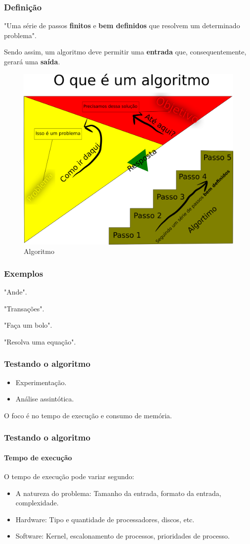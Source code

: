 \begin{frame}
	\frametitle{Definição}
	\par "Uma série de passos \textbf{finitos} e \textbf{bem definidos} que resolvem um determinado problema".
	\par Sendo assim, um algoritmo deve permitir uma \textbf{entrada} que, consequentemente, gerará uma \textbf{saída}.
	\begin{figure}
		\centering
		\includegraphics[width=0.3\linewidth]{images/oQueSaoAlgoritmos}
		\caption{Algoritmo}
		\label{fig:oquesaoalgoritmos}
	\end{figure}
	
\end{frame}

\begin{frame}
	\frametitle{Exemplos}
	\par "Ande".
	\par "Transações".
	\par "Faça um bolo".
	\par "Resolva uma equação".
\end{frame}

\begin{frame}
	\frametitle{Testando o algoritmo}
	\begin{itemize}
		\item Experimentação.
		\item Análise assintótica.
	\end{itemize}
	\par O foco é no tempo de execução e consumo de memória.
\end{frame}

\begin{frame}
	\frametitle{Testando o algoritmo}
	\framesubtitle{Tempo de execução}
	\par O tempo de execução pode variar segundo:
	\begin{itemize}
		\item A natureza do problema: Tamanho da entrada, formato da entrada, complexidade.
		\item Hardware: Tipo e quantidade de processadores, discos, etc.
		\item Software: Kernel, escalonamento de processos, prioridades de processo.
	\end{itemize}
\end{frame}

